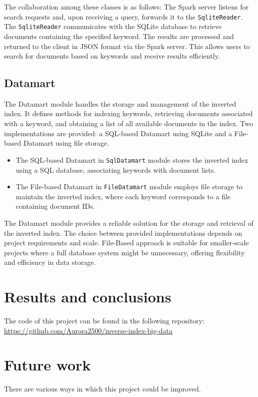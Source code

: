 \documentclass{article}
\begin{document}
The collaboration among these classes is as follows: The Spark server listens for search requests and, upon receiving a query, forwards it to the \texttt{SqliteReader}. The \texttt{SqliteReader} communicates with the SQLite database to retrieve documents containing the specified keyword. The results are processed and returned to the client in JSON format via the Spark server. This allows users to search for documents based on keywords and receive results efficiently.

\subsection{Datamart}

The Datamart module handles the storage and management of the inverted index. It defines methods for indexing keywords, retrieving documents associated with a keyword, and obtaining a list of all available documents in the index. Two implementations are provided: a SQL-based Datamart using SQLite and a File-based Datamart using file storage.
\begin{itemize}

\item 
The SQL-based Datamart in \texttt{SqlDatamart} module stores the inverted index using a SQL database, associating keywords with document lists.

\item 
The File-based Datamart in \texttt{FileDatamart} module employs file storage to maintain the inverted index, where each keyword corresponds to a file containing document IDs. 
\end{itemize}
The Datamart module provides a reliable solution for the storage and retrieval of the inverted index. The choice between provided implementations depends on project requirements and scale.
File-Based approach is suitable for smaller-scale projects where a full database system might be unnecessary, offering flexibility and efficiency in data storage.

\section{Results and conclusions}


The code of this project can be found in the following repository: \url{https://github.com/Aurora2500/inverse-index-big-data}

\section{Future work}

There are various ways in which this project could be improved.
\end{document}
